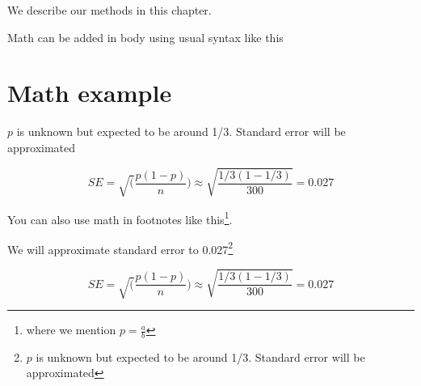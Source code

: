 \documentclass[
]{book}
\begin{document}
We describe our methods in this chapter.

Math can be added in body using usual syntax like this

\hypertarget{math-example}{%
\section{Math example}\label{math-example}}

\(p\) is unknown but expected to be around 1/3. Standard error will be approximated

\[
SE = \sqrt(\frac{p(1-p)}{n}) \approx \sqrt{\frac{1/3 (1 - 1/3)} {300}} = 0.027
\]

You can also use math in footnotes like this\footnote{where we mention \(p = \frac{a}{b}\)}.

We will approximate standard error to 0.027\footnote{\(p\) is unknown but expected to be around 1/3. Standard error will be approximated}

\[
SE = \sqrt(\frac{p(1-p)}{n}) \approx \sqrt{\frac{1/3 (1 - 1/3)} {300}} = 0.027
\]

  
\end{document}
